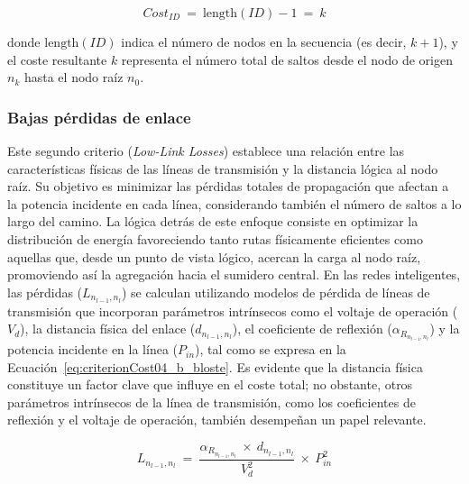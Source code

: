 \begin{equation}
     Cost_{ID}  \: = \: \text{length}(ID) - 1 \: = \: k
\end{equation}

donde \( \text{length}(ID) \) indica el número de nodos en la secuencia (es decir, \( k+1 \)), y el coste resultante \( k \) representa el número total de saltos desde el nodo de origen \( n_k \) hasta el nodo raíz \( n_0 \).

\subsubsection{Bajas pérdidas de enlace}
\label{subsec:criteria_02}

Este segundo criterio (\textit{Low-Link Losses}) establece una relación entre las características físicas de las líneas de transmisión y la distancia lógica al nodo raíz. Su objetivo es minimizar las pérdidas totales de propagación que afectan a la potencia incidente en cada línea, considerando también el número de saltos a lo largo del camino. La lógica detrás de este enfoque consiste en optimizar la distribución de energía favoreciendo tanto rutas físicamente eficientes como aquellas que, desde un punto de vista lógico, acercan la carga al nodo raíz, promoviendo así la agregación hacia el sumidero central. En las redes inteligentes, las pérdidas ($L_{n_{l-1},n_l}$) se calculan utilizando modelos de pérdida de líneas de transmisión que incorporan parámetros intrínsecos como el voltaje de operación ($V_{d}$), la distancia física del enlace ($d_{n_{l-1}, n_l}$), el coeficiente de reflexión ($\alpha_{R_{n_{l-1},n_l}}$) y la potencia incidente en la línea ($P_{in}$), tal como se expresa en la Ecuación~\ref{eq:criterionCost04_b_bloste}. Es evidente que la distancia física constituye un factor clave que influye en el coste total; no obstante, otros parámetros intrínsecos de la línea de transmisión, como los coeficientes de reflexión y el voltaje de operación, también desempeñan un papel relevante.

\begin{equation}\label{eq:criterionCost04_b_bloste}
     L_{n_{l-1},n_l} \: = \: \frac{\alpha_{R_{n_{l-1},n_l}} \: \times \: d_{n_{l-1},n_l}}{V_{d}^{2}}\: \times \: P_{in}^{2}
\end{equation}
\vspace{0.2cm}

